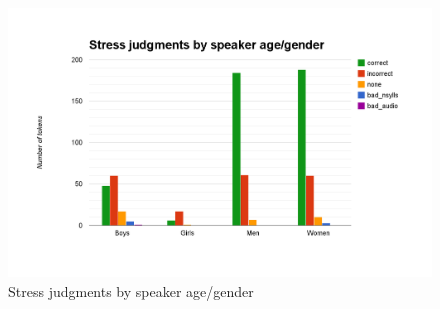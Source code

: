 			
%
%
			
			
			\begin{figure}[htb]
				\centering
				\includegraphics[width=\textwidth]{img/annotation/ageGenderBars}
				\caption{Stress judgments by speaker age/gender}
				\label{fig:results:agegenderbars}
			\end{figure}
			
